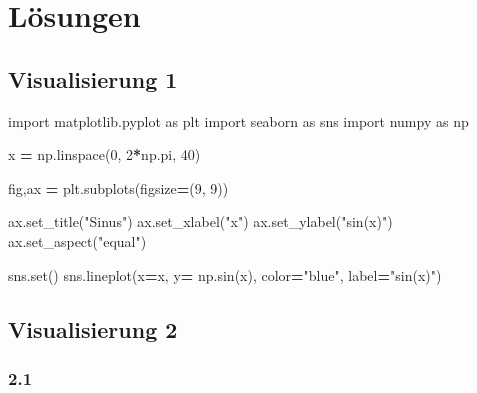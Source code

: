 \documentclass[
  oneside]{book}
\newenvironment{Shaded}{\begin{snugshade}}{\end{snugshade}}
\newcommand{\BuiltInTok}[1]{#1}
\newcommand{\DecValTok}[1]{\textcolor[rgb]{0.00,0.00,0.81}{#1}}
\newcommand{\ImportTok}[1]{#1}
\newcommand{\NormalTok}[1]{#1}
\newcommand{\OperatorTok}[1]{\textcolor[rgb]{0.81,0.36,0.00}{\textbf{#1}}}
\newcommand{\StringTok}[1]{\textcolor[rgb]{0.31,0.60,0.02}{#1}}
\begin{document}
\hypertarget{luxf6sungen}{%
\section{Lösungen}\label{luxf6sungen}}

\hypertarget{visualisierung-1}{%
\subsection{Visualisierung 1}\label{visualisierung-1}}

\begin{Shaded}
\begin{Highlighting}[]
\ImportTok{import}\NormalTok{ matplotlib.pyplot }\ImportTok{as}\NormalTok{ plt}
\ImportTok{import}\NormalTok{ seaborn }\ImportTok{as}\NormalTok{ sns}
\ImportTok{import}\NormalTok{ numpy }\ImportTok{as}\NormalTok{ np}

\NormalTok{x }\OperatorTok{=}\NormalTok{ np.linspace(}\DecValTok{0}\NormalTok{, }\DecValTok{2}\OperatorTok{*}\NormalTok{np.pi, }\DecValTok{40}\NormalTok{)}

\NormalTok{fig,ax }\OperatorTok{=}\NormalTok{ plt.subplots(figsize}\OperatorTok{=}\NormalTok{(}\DecValTok{9}\NormalTok{, }\DecValTok{9}\NormalTok{))}

\NormalTok{ax.set\_title(}\StringTok{"Sinus"}\NormalTok{) }
\NormalTok{ax.set\_xlabel(}\StringTok{"x"}\NormalTok{)}
\NormalTok{ax.set\_ylabel(}\StringTok{"sin(x)"}\NormalTok{)}
\NormalTok{ax.set\_aspect(}\StringTok{"equal"}\NormalTok{)}

\NormalTok{sns.}\BuiltInTok{set}\NormalTok{()}
\NormalTok{sns.lineplot(x}\OperatorTok{=}\NormalTok{x, y}\OperatorTok{=}\NormalTok{ np.sin(x), color}\OperatorTok{=}\StringTok{"blue"}\NormalTok{, label}\OperatorTok{=}\StringTok{"sin(x)"}\NormalTok{)}
\end{Highlighting}
\end{Shaded}

\hypertarget{visualisierung-2}{%
\subsection{Visualisierung 2}\label{visualisierung-2}}

\hypertarget{section}{%
\subsubsection{2.1}\label{section}}
\end{document}
